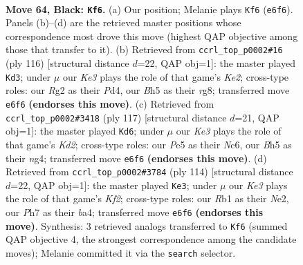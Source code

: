 \documentclass[11pt]{article}
\begin{document}
\clearpage

\begin{figure}[p]\centering
\begin{subfigure}{0.46\textwidth}\centering
\resizebox{\linewidth}{!}{%
\newchessgame
\chessboard[
  setfen={8/7p/4k3/4p2b/8/K7/4n1r1/1r6 b - - 2 64},
  showmover=false,
  pgfstyle=straightmove, color=movearrow, markmove={e6-f6}
]}
\caption{}
\end{subfigure}\hfill
\begin{subfigure}{0.46\textwidth}\centering
\resizebox{\linewidth}{!}{%
\newchessgame
\chessboard[
  setfen={6r1/2k5/8/4N3/1p1P4/8/4KP2/8 w - - 2 59},
  showmover=false,
  pgfstyle=straightmove, color=movearrow, markmove={e2-d3}
]}
\caption{}
\end{subfigure}
\\[4pt]
\begin{subfigure}{0.46\textwidth}\centering
\resizebox{\linewidth}{!}{%
\newchessgame
\chessboard[
  setfen={8/3k4/2n5/8/4P1N1/7R/r7/4K3 b - - 6 59},
  showmover=false,
  pgfstyle=straightmove, color=movearrow, markmove={d7-d6}
]}
\caption{}
\end{subfigure}\hfill
\begin{subfigure}{0.46\textwidth}\centering
\resizebox{\linewidth}{!}{%
\newchessgame
\chessboard[
  setfen={8/8/8/4k3/b6P/5P2/4NK2/8 w - - 13 58},
  showmover=false,
  pgfstyle=straightmove, color=movearrow, markmove={f2-e3}
]}
\caption{}
\end{subfigure}
\caption{\textbf{Move 64, Black: \texttt{Kf6}.} (a) Our position; Melanie plays \texttt{Kf6} (\texttt{e6f6}). Panels (b)--(d) are the retrieved master positions whose correspondence most drove this move (highest QAP objective among those that transfer to it). (b) Retrieved from \texttt{ccrl\_top\_p0002\#16} (ply 116) [structural distance $d$=22, QAP obj=1]: the master played \texttt{Kd3}; under $\mu$ our \emph{Ke3} plays the role of that game's \emph{Ke2}; cross-type roles: our \emph{R}g2 as their \emph{P}d4, our \emph{B}h5 as their \emph{r}g8; transferred move \texttt{e6f6} \textbf{(endorses this move)}. (c) Retrieved from \texttt{ccrl\_top\_p0002\#3418} (ply 117) [structural distance $d$=21, QAP obj=1]: the master played \texttt{Kd6}; under $\mu$ our \emph{Ke3} plays the role of that game's \emph{Kd2}; cross-type roles: our \emph{P}e5 as their \emph{N}c6, our \emph{B}h5 as their \emph{n}g4; transferred move \texttt{e6f6} \textbf{(endorses this move)}. (d) Retrieved from \texttt{ccrl\_top\_p0002\#3784} (ply 114) [structural distance $d$=22, QAP obj=1]: the master played \texttt{Ke3}; under $\mu$ our \emph{Ke3} plays the role of that game's \emph{Kf2}; cross-type roles: our \emph{R}b1 as their \emph{N}e2, our \emph{P}h7 as their \emph{b}a4; transferred move \texttt{e6f6} \textbf{(endorses this move)}. Synthesis: 3 retrieved analogs transferred to \texttt{Kf6} (summed QAP objective 4, the strongest correspondence among the candidate moves); Melanie committed it via the \texttt{search} selector.}
\label{fig:thought-m127}
\end{figure}
\end{document}
